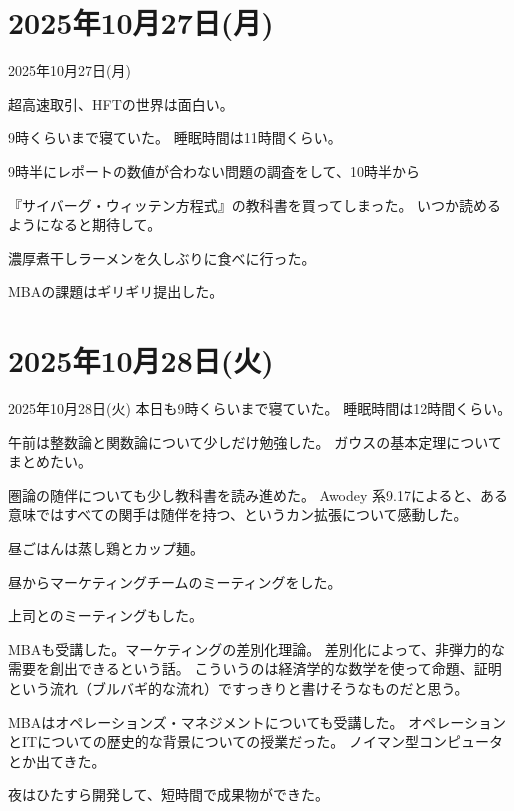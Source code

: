 \documentclass[dvipdfmx, autodetect-engine, aspectratio=169, 10.5pt]{beamer}
\begin{document}
\section{2025年10月27日(月)}

\begin{frame}{2025年10月27日(月)}

	超高速取引、HFTの世界は面白い。

	9時くらいまで寝ていた。
	睡眠時間は11時間くらい。

	9時半にレポートの数値が合わない問題の調査をして、10時半から

	『サイバーグ・ウィッテン方程式』の教科書を買ってしまった。
	いつか読めるようになると期待して。

	濃厚煮干しラーメンを久しぶりに食べに行った。

	MBAの課題はギリギリ提出した。
\end{frame}

\section{2025年10月28日(火)}
\begin{frame}{2025年10月28日(火)}
	\scriptsize
	本日も9時くらいまで寝ていた。
	睡眠時間は12時間くらい。

	午前は整数論と関数論について少しだけ勉強した。
	ガウスの基本定理についてまとめたい。

	圏論の随伴についても少し教科書を読み進めた。
	Awodey 系9.17によると、ある意味ではすべての関手は随伴を持つ、というカン拡張について感動した。

	昼ごはんは蒸し鶏とカップ麺。

	昼からマーケティングチームのミーティングをした。

	上司とのミーティングもした。

	MBAも受講した。マーケティングの差別化理論。
	差別化によって、非弾力的な需要を創出できるという話。
	こういうのは経済学的な数学を使って命題、証明という流れ（ブルバギ的な流れ）ですっきりと書けそうなものだと思う。

	MBAはオペレーションズ・マネジメントについても受講した。
	オペレーションとITについての歴史的な背景についての授業だった。
	ノイマン型コンピュータとか出てきた。

	夜はひたすら開発して、短時間で成果物ができた。
\end{frame}
\end{document}
